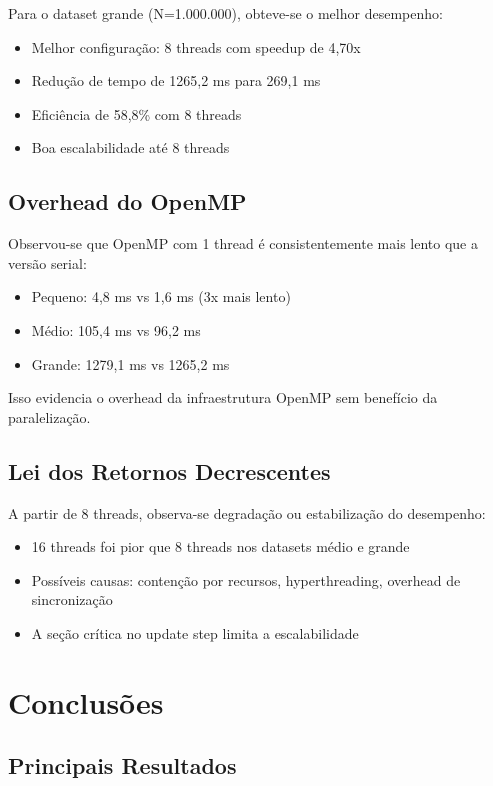 \documentclass[12pt,a4paper]{article}
\begin{document}
Para o dataset grande (N=1.000.000), obteve-se o melhor desempenho:
\begin{itemize}
    \item Melhor configuração: 8 threads com speedup de 4,70x
    \item Redução de tempo de 1265,2 ms para 269,1 ms
    \item Eficiência de 58,8\% com 8 threads
    \item Boa escalabilidade até 8 threads
\end{itemize}

\subsection{Overhead do OpenMP}

Observou-se que OpenMP com 1 thread é consistentemente mais lento que a versão serial:
\begin{itemize}
    \item Pequeno: 4,8 ms vs 1,6 ms (3x mais lento)
    \item Médio: 105,4 ms vs 96,2 ms
    \item Grande: 1279,1 ms vs 1265,2 ms
\end{itemize}

Isso evidencia o overhead da infraestrutura OpenMP sem benefício da paralelização.

\subsection{Lei dos Retornos Decrescentes}

A partir de 8 threads, observa-se degradação ou estabilização do desempenho:
\begin{itemize}
    \item 16 threads foi pior que 8 threads nos datasets médio e grande
    \item Possíveis causas: contenção por recursos, hyperthreading, overhead de sincronização
    \item A seção crítica no update step limita a escalabilidade
\end{itemize}

\section{Conclusões}

\subsection{Principais Resultados}
\end{document}
